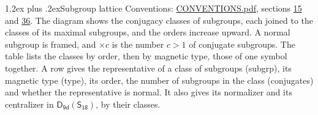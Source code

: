 \documentclass[10pt,a4paper]{article}
\makeatletter
\renewcommand\section{\@startsection{section}{1}{\z@}{-3ex plus -1ex minus -.2ex}%
  {1.2ex plus .2ex}{\normalfont\large\sffamily\bfseries\color{parttitle}}}
\numberwithin{equation}{section}
\newcommand{\grp}[1]{\mathsf{#1}}
\makeatother
\begin{document}
\section{Subgroup lattice}\label{s:subgroups}
Conventions: \href{../../CONVENTIONS.pdf}{CONVENTIONS.pdf}, sections \href{../../../rotation/CONVENTIONS.pdf\#conv.15}{15} and \href{../../CONVENTIONS.pdf\#conv.36}{36}.
The diagram shows the conjugacy classes of subgroups, each joined to the classes of its maximal subgroups, and the orders increase upward. \label{n:index.conjugates.c}\label{n:mark.conjugates}A normal subgroup is framed, and ${\times}c$ is the number $c > 1$ of conjugate subgroups. The table lists the classes by order, then by magnetic type, those of one symbol together. \label{n:head.subgroup}\label{n:head.magnetic.type}\label{n:head.order}\label{n:head.conjugates}\label{n:head.normal}A row gives the representative of a class of subgroups (subgrp), its magnetic type (type), its order, the number of subgroups in the class (conjugates) and whether the representative is normal. \label{n:head.normalizer}\label{n:head.centralizer}It also gives its normalizer and its centralizer in $\grp{D_{9d}}(\grp{S_{18}})$, by their classes. 
\end{document}
